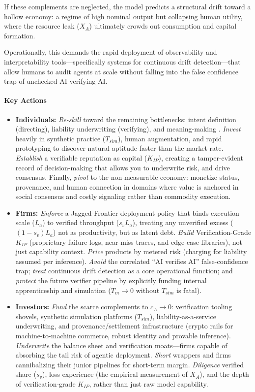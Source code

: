 \documentclass[12pt, letter]{article}
\begin{document}
If these complements are neglected, the model predicts a structural drift toward a hollow economy: a regime of high nominal output but collapsing human utility, where the resource leak ($X_A$) ultimately crowds out consumption and capital formation.

Operationally, this demands the rapid deployment of observability and interpretability tools—specifically systems for continuous drift detection—that allow humans to audit agents at scale without falling into the false confidence trap of unchecked AI-verifying-AI.


\paragraph{Key Actions}
\begin{itemize}
\item \textbf{Individuals:} \emph{Re-skill} toward the remaining bottlenecks: intent definition (directing), liability underwriting (verifying), and meaning-making . \emph{Invest} heavily in synthetic practice ($T_{sim}$), human augmentation, and rapid prototyping to discover natural aptitude faster than the market rate. \emph{Establish} a verifiable reputation as capital ($K_{IP}$), creating a tamper-evident record of decision-making that allows you to underwrite risk, and drive consensus. Finally, \emph{pivot} to the non-measurable economy: monetize status, provenance, and human connection in domains where value is anchored in social consensus and costly signaling rather than commodity execution.

\item \textbf{Firms:} \emph{Enforce} a Jagged-Frontier deployment policy that binds execution scale ($L_a$) to verified throughput ($s_v L_a$), treating any unverified excess ($(1-s_v)L_a$) not as productivity, but as latent debt. \emph{Build} Verification-Grade $K_{IP}$ (proprietary failure logs, near-miss traces, and edge-case libraries), not just capability context. \emph{Price} products by metered risk (charging for liability assumed per inference). \emph{Avoid} the correlated ``AI verifies AI'' false-confidence trap; \emph{treat} continuous drift detection as a core operational function; and \emph{protect} the future verifier pipeline by explicitly funding internal apprenticeship and simulation ($T_m \to 0$ without $T_{sim}$ is fatal).

\item \textbf{Investors:} \emph{Fund} the scarce complements to $c_A \to 0$: verification tooling shovels, synthetic simulation platforms ($T_{sim}$), liability-as-a-service underwriting, and provenance/settlement infrastructure (crypto rails for machine-to-machine commerce, robust identity and provable inference). \emph{Underwrite} the balance sheet and verification moats—firms capable of absorbing the tail risk of agentic deployment. \emph{Short} wrappers and firms cannibalizing their junior pipelines for short-term margin. \emph{Diligence} verified share ($s_v$), loss experience (the empirical measurement of $X_A$), and the depth of verification-grade $K_{IP}$, rather than just raw model capability.


\end{itemize}
\end{document}

